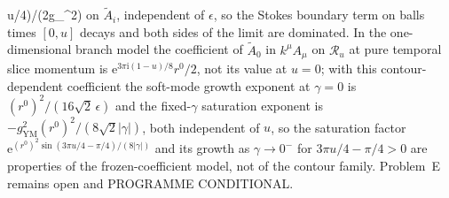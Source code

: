 u/4)/(2g_{}^2)\) on \(\tilde A_i\), independent of \(\epsilon\), so the Stokes boundary term on balls times \([0,u]\) decays and both sides of the limit are dominated. In the one-dimensional branch model the coefficient of \(\tilde A_0\) in \(k^\mu A_\mu\) on \(\mathcal R_u\) at pure temporal slice momentum is \(\mathrm e^{3\pi\mathrm i(1-u)/8}r^0/2\), not its value at \(u=0\); with this contour-dependent coefficient the soft-mode growth exponent at \(\gamma=0\) is \({(r^0)}^2/(16\sqrt2\,\epsilon)\) and the fixed-\(\gamma\) saturation exponent is \(-g_{\mathrm{YM}}^2{(r^0)}^2/(8\sqrt2|\gamma|)\), both independent of \(u\), so the saturation factor \(\mathrm e^{{(r^0)}^2\sin(3\pi u/4-\pi/4)/(8|\gamma|)}\) and its growth as \(\gamma\to0^-\) for \(3\pi u/4-\pi/4>0\) are properties of the frozen-coefficient model, not of the contour family. Problem~E remains open and PROGRAMME CONDITIONAL.

